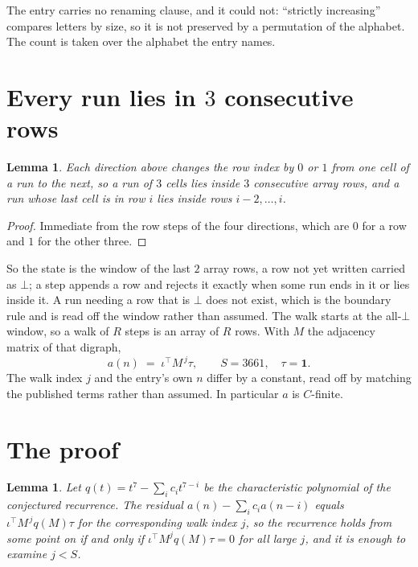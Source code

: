 \documentclass[11pt,a4paper]{article}
\theoremstyle{plain}
\newtheorem{lemma}[theorem]{Lemma}
\theoremstyle{definition}
\begin{document}
The entry carries no renaming clause, and it could not: ``strictly increasing'' compares
letters by size, so it is not preserved by a permutation of the alphabet. The count is taken
over the alphabet the entry names.

\section{Every run lies in $3$ consecutive rows}

\begin{lemma}\label{lem:win}
Each direction above changes the row index by $0$ or $1$ from one cell of a run to the next, so
a run of $3$ cells lies inside $3$ consecutive array rows, and a run whose last cell is in
row $i$ lies inside rows $i-2,\dots,i$.
\end{lemma}

\begin{proof}
Immediate from the row steps of the four directions, which are $0$ for a row and $1$ for the
other three.
\end{proof}

So the state is the window of the last $2$ array rows, a row not yet written carried as
$\bot$; a step appends a row and rejects it exactly when some run ends in it or lies inside it.
A run needing a row that is $\bot$ does not exist, which is the boundary rule and is read off
the window rather than assumed. The walk starts at the all-$\bot$ window, so a walk of $R$ steps
is an array of $R$ rows. With $M$ the adjacency matrix of that digraph,
\[
a(n)\;=\;\iota^{\!\top}M^{\,j}\tau ,\qquad S=3661,\quad\tau=\mathbf{1} .
\]
The walk index $j$ and the entry's own $n$ differ by a constant, read off by matching the
published terms rather than assumed. In particular $a$ is $C$-finite.

\section{The proof}

\begin{lemma}\label{lem:crit}
Let $q(t)=t^{7}-\sum_i c_it^{7-i}$ be the characteristic polynomial of the
conjectured recurrence. The residual $a(n)-\sum_ic_ia(n-i)$ equals
$\iota^{\!\top}M^{\,j}q(M)\tau$ for the corresponding walk index $j$, so the recurrence
holds from some point on if and only if $\iota^{\!\top}M^{j}q(M)\tau=0$ for all large $j$,
and it is enough to examine $j<S$.
\end{lemma}
\end{document}
